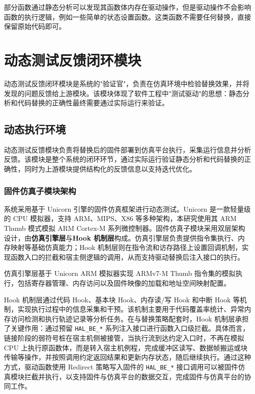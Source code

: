 部分函数通过静态分析可以发现其函数体内存在驱动操作，但是驱动操作不会影响函数的执行逻辑，例如一些简单的状态设置函数。这类函数不需要任何替换，直接保留原始代码即可。


\section{动态测试反馈闭环模块}
\label{sec:feedback}

动态测试反馈闭环模块是系统的"验证官"，负责在仿真环境中检验替换效果，并将发现的问题反馈给上游模块。该模块体现了软件工程中"测试驱动"的思想：静态分析和代码替换的正确性最终需要通过实际运行来验证。

\subsection{动态执行环境}

动态测试反馈模块负责将替换后的固件部署到仿真平台执行，采集运行信息并分析反馈。该模块是整个系统的闭环环节，通过实际运行验证静态分析和代码替换的正确性，同时为上游模块提供结构化的反馈信息以支持迭代优化。

\subsubsection{固件仿真子模块架构}

系统采用基于 Unicorn 引擎的固件仿真框架进行动态测试。Unicorn 是一款轻量级的 CPU 模拟器，支持 ARM、MIPS、X86 等多种架构，本研究使用其 ARM Thumb 模式模拟 ARM Cortex-M 系列微控制器。固件仿真子模块采用双层架构设计，由\textbf{仿真引擎层}与\textbf{Hook 机制层}构成。仿真引擎层负责提供指令集执行、内存映射等基础仿真能力；Hook 机制层则在指令流和访存路径上设置回调机制，实现函数入口的拦截和宿主侧逻辑的调用，从而支持驱动替换后注入接口的执行。

仿真引擎层基于 Unicorn ARM 模拟器实现 ARMv7-M Thumb 指令集的模拟执行，包括寄存器管理、内存访问以及固件映像的加载和地址空间映射配置。

Hook 机制层通过代码 Hook、基本块 Hook、内存读/写 Hook 和中断 Hook 等机制，实现执行过程中的信息采集和干预。该机制主要用于代码覆盖率统计、异常内存访问检测和执行轨迹记录等分析任务。在与替换策略配套时，Hook 机制层承担了关键作用：通过预留 \texttt{HAL\_BE\_*} 系列注入接口进行函数入口级拦截。具体而言，链接阶段的弱符号桩在宿主机侧被接管，当执行流到达约定入口时，不再在模拟 CPU 上执行原函数体，而是转入宿主机例程，完成缓冲区读写、数据帧搬运或块传输等操作，并按照调用约定返回结果和更新内存状态，随后继续执行。通过这种方式，驱动函数使用 Redirect 策略写入固件的 \texttt{HAL\_BE\_*} 接口调用可以被固件仿真模块拦截并执行，以支持固件与仿真平台的数据交互，完成固件与仿真平台的协同工作。

